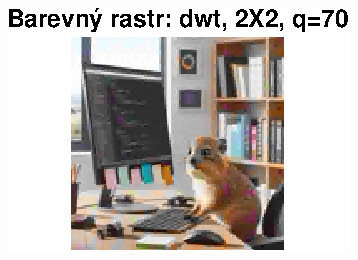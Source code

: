 \begin{figure}[H]
\begin{minipage}[b]{0.3\textwidth}
        \includegraphics[width=\textwidth]{images/barevny_dwt_2X2_q70.eps}
    \end{minipage}
\end{figure}

